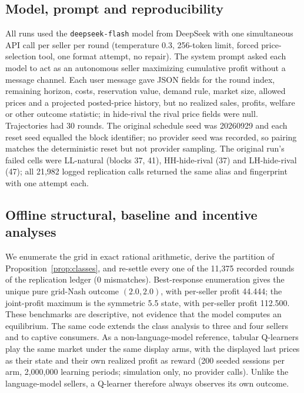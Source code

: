 \documentclass[sigconf,review,anonymous]{acmart}
\begin{document}
\subsection{Model, prompt and reproducibility}

All runs used the \texttt{deepseek-flash} model from DeepSeek with one simultaneous API call per seller per round (temperature 0.3, 256-token limit, forced price-selection tool, one format attempt, no repair). The system prompt asked each model to act as an autonomous seller maximizing cumulative profit without a message channel. Each user message gave JSON fields for the round index, remaining horizon, costs, reservation value, demand rule, market size, allowed prices and a projected posted-price history, but no realized sales, profits, welfare or other outcome statistic; in hide-rival the rival price fields were null. Trajectories had 30 rounds. The original schedule seed was 20260929 and each reset seed equalled the block identifier; no provider seed was recorded, so pairing matches the deterministic reset but not provider sampling. The original run's failed cells were LL-natural (blocks 37, 41), HH-hide-rival (37) and LH-hide-rival (47); all 21,982 logged replication calls returned the same alias and fingerprint with one attempt each.

\subsection{Offline structural, baseline and incentive analyses}

We enumerate the grid in exact rational arithmetic, derive the partition of Proposition~\ref{prop:classes}, and re-settle every one of the 11,375 recorded rounds of the replication ledger (0 mismatches). Best-response enumeration gives the unique pure grid-Nash outcome $(2.0,2.0)$, with per-seller profit 44.444; the joint-profit maximum is the symmetric 5.5 state, with per-seller profit 112.500. These benchmarks are descriptive, not evidence that the model computes an equilibrium. The same code extends the class analysis to three and four sellers and to captive consumers. As a non-language-model reference, tabular Q-learners \cite{watkins1992qlearning} play the same market under the same display arms, with the displayed last prices as their state and their own realized profit as reward (200 seeded sessions per arm, 2,000,000 learning periods; simulation only, no provider calls). Unlike the language-model sellers, a Q-learner therefore always observes its own outcome.
\end{document}
